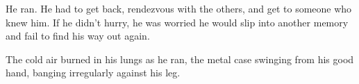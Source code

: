He ran.  He had to get back, rendezvous with the others, and get to someone who knew him.  If he didn't hurry, he was worried he would slip into another memory and fail to find his way out again.



The cold air burned in his lungs as he ran, the metal case swinging from his good hand, banging irregularly against his leg.





